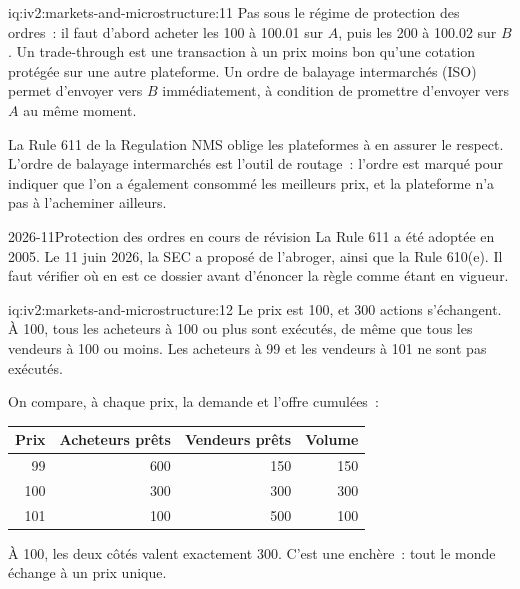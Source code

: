 \begin{solution}{iq:iv2:markets-and-microstructure:11}
Pas sous le régime de protection des ordres~: il faut d'abord acheter les 100 à 100.01 sur $A$, puis les 200 à 100.02 sur $B$. Un trade-through est une transaction à un prix moins bon qu'une cotation protégée sur une autre plateforme. Un ordre de balayage intermarchés (ISO) permet d'envoyer vers $B$ immédiatement, à condition de promettre d'envoyer vers $A$ au même moment.

La Rule 611 de la Regulation NMS oblige les plateformes à en assurer le respect. L'ordre de balayage intermarchés est l'outil de routage~: l'ordre est marqué pour indiquer que l'on a également consommé les meilleurs prix, et la plateforme n'a pas à l'acheminer ailleurs.

\begin{dated}{2026-11}{Protection des ordres en cours de révision}\label{dat:iv2:markets-and-microstructure:rule611}
La Rule 611 a été adoptée en 2005. Le 11 juin 2026, la SEC a proposé de l'abroger, ainsi que la Rule 610(e). Il faut vérifier où en est ce dossier avant d'énoncer la règle comme étant en vigueur.
\end{dated}

\end{solution}

\begin{solution}{iq:iv2:markets-and-microstructure:12}
Le prix est 100, et 300 actions s'échangent. À 100, tous les acheteurs à 100 ou plus sont exécutés, de même que tous les vendeurs à 100 ou moins. Les acheteurs à 99 et les vendeurs à 101 ne sont pas exécutés.

On compare, à chaque prix, la demande et l'offre cumulées~:
\begin{center}\small
\begin{tabular}{@{}rrrr@{}}
Prix & Acheteurs prêts & Vendeurs prêts & Volume \\ \hline
99 & 600 & 150 & 150 \\
100 & 300 & 300 & 300 \\
101 & 100 & 500 & 100
\end{tabular}
\end{center}
À 100, les deux côtés valent exactement 300. C'est une enchère~: tout le monde échange à un prix unique.

\end{solution}

